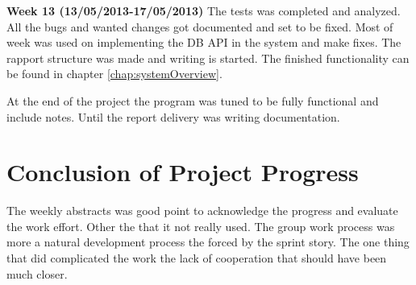 \textbf{Week 13 (13/05/2013-17/05/2013)}
The tests was completed and analyzed. 
All the bugs and wanted changes got documented and set to be fixed.
Most of week was used on implementing the DB API in the system and make fixes.     
The rapport structure was made and writing is started. 
The finished functionality can be found in chapter \vref{chap:systemOverview}.
 
At the end of the project the program was tuned to be fully functional and include notes.
Until the report delivery was writing documentation.       

\section{Conclusion of Project Progress}
The weekly abstracts was good point to acknowledge the progress and evaluate the work effort.
Other the that it not really used. 
The group work process was more a natural development process the forced by the sprint story.       
The one thing that did complicated the work the lack of cooperation that should have been much closer. 
\label{sec:conclusionofProjectProgress}


